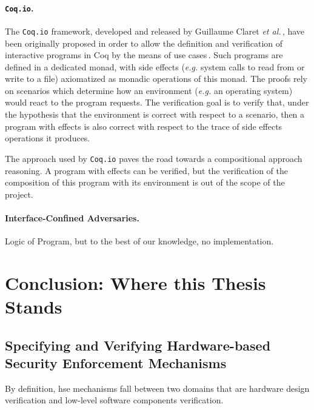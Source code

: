 \paragraph{\texttt{Coq.io}.}
%
The \texttt{Coq.io} framework, developed and released by Guillaume Claret
\emph{et al.}\,\cite{claret2015coqiowww}, have been originally proposed in order
to allow the definition and verification of interactive programs in Coq by the
means of use cases\,\cite{claret2015coqio}.
%
Such programs are defined in a dedicated monad, with side effects (\emph{e.g.}
system calls to read from or write to a file) axiomatized as monadic operations
of this monad.
%
The proofs rely on scenarios which determine how an environment (\emph{e.g.} an
operating system) would react to the program requests.
%
The verification goal is to verify that, under the hypothesis that the
environment is correct with respect to a scenario, then a program with effects
is also correct with respect to the trace of side effects operations it
produces.

The approach used by \texttt{Coq.io} paves the road towards a compositional
approach reasoning.
%
A program with effects can be verified, but the verification of the composition
of this program with its environment is out of the scope of the project.

\paragraph{Interface-Confined Adversaries.}
%
Logic of Program, but to the best of our knowledge, no implementation.
%

\section{Conclusion: Where this Thesis Stands}
\label{sec:sota:conclusion}


\subsection{Specifying and Verifying Hardware-based Security Enforcement
  Mechanisms}

By definition, \ac{hse} mechanisms fall between two domains that are hardware
design verification and low-level software components verification.

